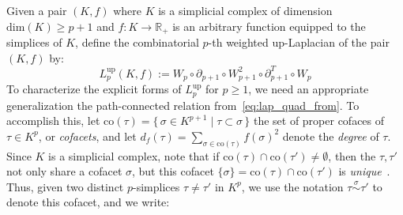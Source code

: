 \documentclass[10pt]{article}
\numberwithin{equation}{section}
\newcommand{\+}{%
	\raisebox{0.18ex}{\scaleobj{0.55}{+}}
}
\theoremstyle{definition}
\begin{document}




Given a pair $(K, f)$ where $K$ is a simplicial complex of dimension $\mathrm{dim}(K) \geq p+1$ and $f : K \to \mathbb{R}_+$ is an arbitrary function equipped to the simplices of $K$, define the combinatorial $p$-th weighted up-Laplacian of the pair $(K, f)$ by: 
$$ L_p^{\mathrm{up}}(K, f) := W_p \circ \partial_{p+1} \circ W_{p+1}^2 \circ \partial_{p+1}^T \circ W_p $$
To characterize the explicit forms of $L_p^{\mathrm{up}}$ for $p \geq 1$, we need an appropriate generalization the path-connected relation from~\eqref{eq:lap_quad_from}.
To accomplish this, let $\mathrm{co}(\tau) = \{ \, \sigma \in K^{p+1} \mid \tau \subset \sigma \, \}$ the set of proper cofaces of $\tau \in K^p$, or \emph{cofacets}, and let $d_f(\tau) = \sum_{\sigma \in \mathrm{co}(\tau)} f(\sigma)^2$ denote the \emph{degree} of $\tau$.
Since $K$ is a simplicial complex, note that if $\mathrm{co}(\tau) \cap \mathrm{co}(\tau') \neq \emptyset$, then the $\tau, \tau'$ not only share a cofacet $\sigma$, but this cofacet $\{\sigma\} = \mathrm{co}(\tau) \cap \mathrm{co}(\tau')$ is \emph{unique}~\cite{}. Thus, given two distinct $p$-simplices $\tau \neq \tau'$ in $K^p$, we use the notation $\tau \overset{\sigma}{\sim} \tau'$ to denote this cofacet, and we write:
\end{document}
